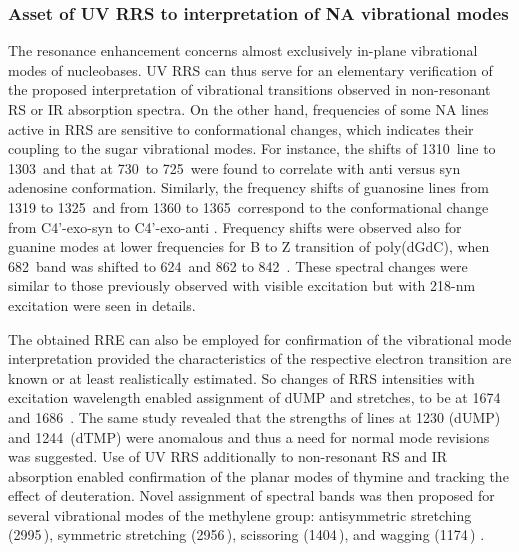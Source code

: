 \subsubsection{Asset of UV RRS to interpretation of NA vibrational modes}

The resonance enhancement concerns almost exclusively in-plane vibrational
modes of nucleobases.
UV RRS can thus serve for an elementary verification of the proposed
interpretation of vibrational transitions observed in non-resonant RS or IR
absorption spectra.
On the other hand, frequencies of some NA lines active in RRS are sensitive to
conformational changes, which indicates their coupling to the sugar vibrational
modes.
For instance, the shifts of 1310\,\icm{} line to 1303\,\icm{} and that at
730\,\icm{} to 725\,\icm{} were found to correlate with anti versus syn
adenosine conformation.
Similarly, the frequency shifts of guanosine lines from 1319 to 1325\,\icm{}
and from 1360 to 1365\,\icm{} correspond to the conformational change from
C4'-exo-syn to C4'-exo-anti
\parencite{Nishimura1987}.
Frequency shifts were observed also for guanine modes at lower frequencies for
B to Z transition of poly(dGdC), when 682\,\icm{} band was shifted to
624\,\icm{} and 862 to 842\,\icm{}
\parencite{Fodor1986a}.
These spectral changes were similar to those previously observed with visible
excitation but with 218-nm excitation were seen in details.

The obtained RRE can also be employed for confirmation of the vibrational mode
interpretation provided the characteristics of the respective electron
transition are known or at least realistically estimated.
So changes of RRS intensities with excitation wavelength enabled assignment of
dUMP  and  stretches, to be at 1674 and
1686\,\icm{}
\parencite{Fodor1985}.
The same study revealed that the strengths of lines at 1230 (dUMP) and
1244\,\icm{} (dTMP) were anomalous and thus a need for normal mode revisions
was suggested.
Use of UV RRS additionally to non-resonant RS and IR absorption enabled
confirmation of the planar modes of thymine and tracking the effect of
deuteration.
Novel assignment of spectral bands was then proposed for several vibrational
modes of the methylene group:  antisymmetric stretching
(2995\,\icm{}), symmetric stretching (2956\,\icm{}), scissoring (1404\,\icm{}),
and wagging (1174\,\icm{})
\parencite{Tsuboi1997}.

